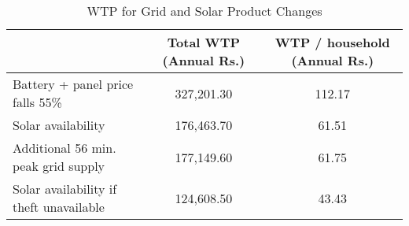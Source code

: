 \begin{table}[htbp]\centering
\caption{WTP for Grid and Solar Product Changes}
\begin{tabular}{l*{2}{c}}
\toprule
                &     Total WTP (Annual Rs.) &   WTP / household (Annual Rs.) \\
\midrule
Battery + panel price falls 55\% &    327,201.30&    112.17\\

Solar availability    &    176,463.70&    61.51\\

Additional 56 min. peak grid supply   &    177,149.60&    61.75\\

Solar availability if theft unavailable & 124,608.50 & 43.43 \\

\bottomrule
\end{tabular}
\end{table}